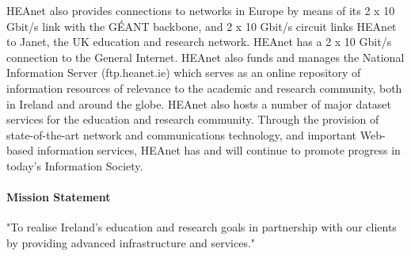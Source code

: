 \documentclass{article}
\begin{document}
HEAnet also provides connections to networks in Europe by means of its 2 x 10 Gbit/s link with the GÉANT backbone, and 2 x 10 Gbit/s circuit links HEAnet to Janet, the UK education and research network. HEAnet has a 2 x 10 Gbit/s connection to the General Internet. HEAnet also funds and manages the National Information Server (ftp.heanet.ie) which serves as an online repository of information resources of relevance to the academic and research community, both in Ireland and around the globe. HEAnet also hosts a number of major dataset services for the education and research community. Through the provision of state-of-the-art network and communications technology, and important Web-based information services, HEAnet has and will continue to promote progress in today's Information Society.
	
\paragraph{Mission Statement}
"To realise Ireland's education and research goals in partnership with our clients by providing advanced infrastructure and services."
\end{document}
